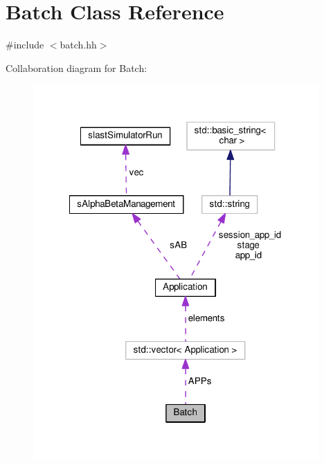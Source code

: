 \hypertarget{classBatch}{\section{Batch Class Reference}
\label{classBatch}
}


{\ttfamily \#include $<$batch.\-hh$>$}



Collaboration diagram for Batch\-:\nopagebreak
\begin{figure}[H]
\begin{center}
\leavevmode
\includegraphics[width=309pt]{classBatch__coll__graph}
\end{center}
\end{figure}
